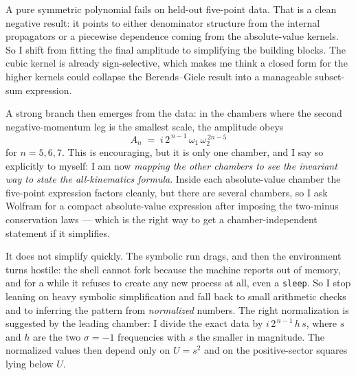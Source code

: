 \documentclass{article}
\begin{document}
A pure symmetric polynomial fails on held-out five-point data. That is a clean
negative result: it points to either denominator structure from the internal
propagators or a piecewise dependence coming from the absolute-value kernels. So
I shift from fitting the final amplitude to simplifying the building blocks. The
cubic kernel is already sign-selective, which makes me think a closed form for
the higher kernels could collapse the Berends--Giele result into a manageable
subset-sum expression.

A strong branch then emerges from the data: in the chambers where the
second negative-momentum leg is the smallest scale, the amplitude obeys
\[
A_n \;=\; i\,2^{\,n-1}\,\omega_1\,\omega_2^{\,2n-5}
\]
for $n=5,6,7$. This is encouraging, but it is only one chamber, and I say so
explicitly to myself: I am now \emph{mapping the other chambers to see the
invariant way to state the all-kinematics formula}. Inside each absolute-value
chamber the five-point expression factors cleanly, but there are several
chambers, so I ask Wolfram for a compact absolute-value expression after imposing
the two-minus conservation laws --- which is the right way to get a
chamber-independent statement if it simplifies.

It does not simplify quickly. The symbolic run drags, and then the environment
turns hostile: the shell cannot fork because the machine reports out of memory,
and for a while it refuses to create any new process at all, even a
\texttt{sleep}. So I stop leaning on heavy symbolic simplification and fall back
to small arithmetic checks and to inferring the pattern from \emph{normalized}
numbers. The right normalization is suggested by the leading chamber: I divide
the exact data by $i\,2^{\,n-1}\,h\,s$, where $s$ and $h$ are the two $\sigma=-1$
frequencies with $s$ the smaller in magnitude. The normalized values then depend
only on $U=s^2$ and on the positive-sector squares lying below $U$.
\end{document}

